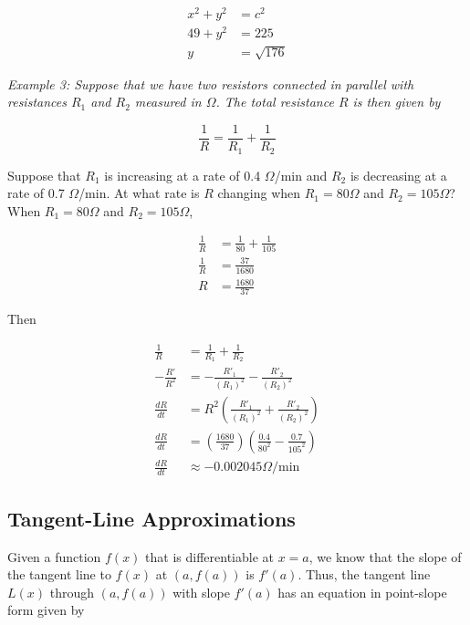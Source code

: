         \begin{align*}
            x^2+y^2     &=c^2 \\
            49 + y^2    &= 225 \\
            y           &= \sqrt{176}
        \end{align*}

        \noindent \color{blue} \textit{Example 3: Suppose that we have two resistors connected in
        parallel with resistances $R_1$ and $R_2$ measured in $\Omega$. The total resistance $R$
        is then given by}

        \begin{equation*}
            \frac{1}{R} = \frac{1}{R_1} + \frac{1}{R_2}
        \end{equation*}

        \noindent Suppose that $R_1$ is increasing at a rate of 0.4 $\Omega$/min and $R_2$ is
        decreasing at a rate of 0.7 $\Omega$/min. At what rate is $R$ changing when $R_1=80\Omega$
        and $R_2=105\Omega$? \color{black} \\

        \noindent When $R_1=80\Omega$ and $R_2=105\Omega$,

        \begin{align*}
            \frac{1}{R}     &= \frac{1}{80} + \frac{1}{105} \\
            \frac{1}{R}     &= \frac{37}{1680} \\
            R               &= \frac{1680}{37}
        \end{align*}

        \noindent Then

        \begin{align*}
            \frac{1}{R}     &= \frac{1}{R_1} + \frac{1}{R_2} \\
            -\frac{R'}{R^2} &= -\frac{R'_1}{(R_1)^2} - \frac{R'_2}{(R_2)^2} \\
            \frac{dR}{dt}   &= R^2\left(\frac{R'_1}{(R_1)^2}+\frac{R'_2}{(R_2)^2}\right) \\
            \frac{dR}{dt}   &= \left(\frac{1680}{37}\right)\left(\frac{0.4}{80^2}-\frac{0.7}{105^2}\right) \\
            \frac{dR}{dt}   &\approx -0.002045 \Omega\text{/min}
        \end{align*}


    \subsection{Tangent-Line Approximations}
        Given a function $f(x)$ that is differentiable at $x=a$, we know that the slope of the
        tangent line to $f(x)$ at $(a,f(a))$ is $f'(a)$. Thus, the tangent line $L(x)$ through
        $(a,f(a))$ with slope $f'(a)$ has an equation in point-slope form given by

